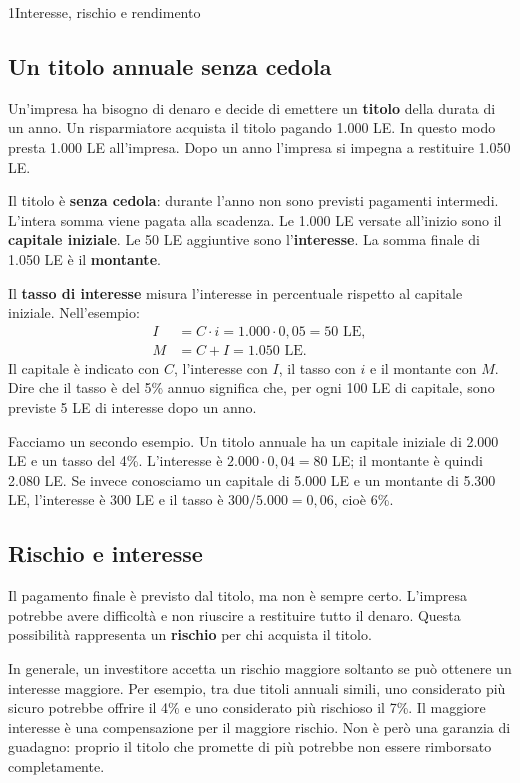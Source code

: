 \begin{lettura}{1}{Interesse, rischio e rendimento}


\subsection*{Un titolo annuale senza cedola}
Un'impresa ha bisogno di denaro e decide di emettere un \textbf{titolo} della durata di un anno. Un risparmiatore acquista il titolo pagando 1.000 LE. In questo modo presta 1.000 LE all'impresa. Dopo un anno l'impresa si impegna a restituire 1.050 LE.

Il titolo è \textbf{senza cedola}: durante l'anno non sono previsti pagamenti intermedi. L'intera somma viene pagata alla scadenza. Le 1.000 LE versate all'inizio sono il \textbf{capitale iniziale}. Le 50 LE aggiuntive sono l'\textbf{interesse}. La somma finale di 1.050 LE è il \textbf{montante}.

Il \textbf{tasso di interesse} misura l'interesse in percentuale rispetto al capitale iniziale. Nell'esempio:
\[
\begin{aligned}
I&=C\cdot i=1.000\cdot 0{,}05=50\text{ LE},\\
M&=C+I=1.050\text{ LE}.
\end{aligned}
\]
Il capitale è indicato con $C$, l'interesse con $I$, il tasso con $i$ e il montante con $M$. Dire che il tasso è del 5\% annuo significa che, per ogni 100 LE di capitale, sono previste 5 LE di interesse dopo un anno.

Facciamo un secondo esempio. Un titolo annuale ha un capitale iniziale di 2.000 LE e un tasso del 4\%. L'interesse è $2.000\cdot 0{,}04=80$ LE; il montante è quindi 2.080 LE. Se invece conosciamo un capitale di 5.000 LE e un montante di 5.300 LE, l'interesse è 300 LE e il tasso è $300/5.000=0{,}06$, cioè 6\%.

\subsection*{Rischio e interesse}
Il pagamento finale è previsto dal titolo, ma non è sempre certo. L'impresa potrebbe avere difficoltà e non riuscire a restituire tutto il denaro. Questa possibilità rappresenta un \textbf{rischio} per chi acquista il titolo.

In generale, un investitore accetta un rischio maggiore soltanto se può ottenere un interesse maggiore. Per esempio, tra due titoli annuali simili, uno considerato più sicuro potrebbe offrire il 4\% e uno considerato più rischioso il 7\%. Il maggiore interesse è una compensazione per il maggiore rischio. Non è però una garanzia di guadagno: proprio il titolo che promette di più potrebbe non essere rimborsato completamente.


\end{lettura}

